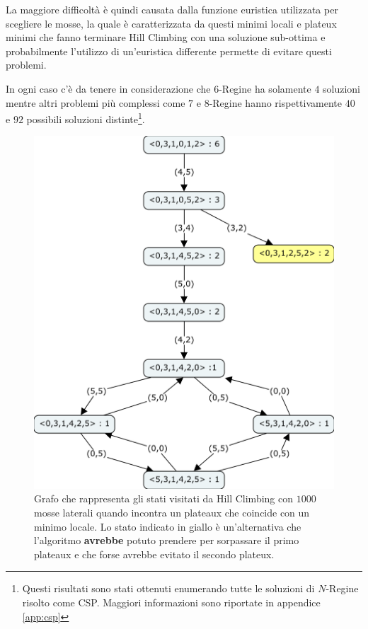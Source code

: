 La maggiore difficoltà è quindi causata dalla funzione euristica utilizzata per scegliere le mosse, la quale è caratterizzata da questi minimi locali e plateux minimi che fanno terminare Hill Climbing con una soluzione sub-ottima e probabilmente l'utilizzo di un'euristica differente permette di evitare questi problemi.

In ogni caso c'è da tenere in considerazione che $6$-Regine ha solamente $4$ soluzioni mentre altri problemi più complessi come $7$ e $8$-Regine hanno rispettivamente $40$ e $92$ possibili soluzioni distinte\footnote{Questi risultati sono stati ottenuti enumerando tutte le soluzioni di $N$-Regine risolto come CSP. Maggiori informazioni sono riportate in appendice \ref{app:csp}}.

\begin{figure}[ht]
\centering
\includegraphics[width=\textwidth]{./immagini/ciclo.png}
\caption{Grafo che rappresenta gli stati visitati da Hill Climbing con $1000$ mosse laterali quando incontra un plateaux che coincide con un minimo locale. Lo stato indicato in giallo è un'alternativa che l'algoritmo \textbf{avrebbe} potuto prendere per sorpassare il primo plateaux e che forse avrebbe evitato il secondo plateux.}
\label{fig:ciclo}
\end{figure}

